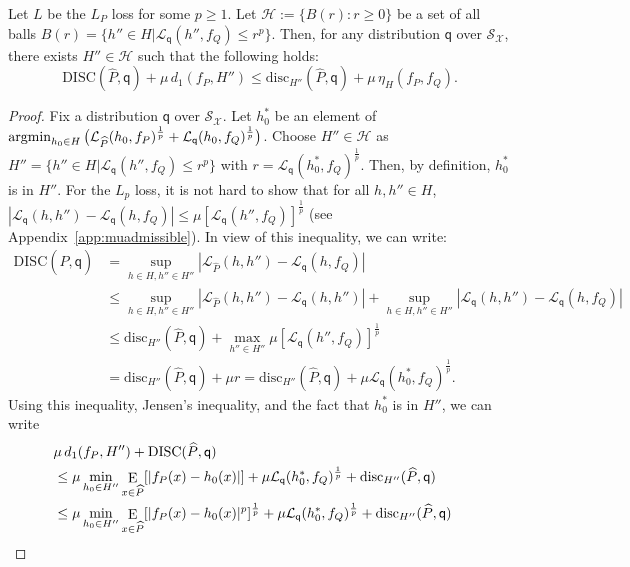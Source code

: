 \documentclass[twoside,11pt]{article}
\DeclareMathOperator*{\E}{\rm E}
\DeclareMathOperator*{\argmin}{\rm argmin}
\newcommand{\h}{\widehat}
\newcommand{\cL}{{\mathcal L}}
\newcommand{\cS}{{\mathcal S}}
\newcommand{\cX}{{\mathcal X}}
\newcommand{\1}{\mat{1}}
\newcommand{\qq}{{\mathsf q}}
\newcommand{\dis}{\mathrm{disc}}
\newcommand{\DIS}{\mathrm{DISC}}
\newcommand{\done}{d_1}
\begin{document}
\begin{theorem}
\label{th:betterbound}
Let $L$ be the $L_P$ loss for some $p \geq 1$.  Let
$\mathscr{H} := \{B(r)\colon r \geq 0\}$ be a set of all balls
$B(r) = \{ h'' \in H |\cL_{\qq}(h'', f_Q)\leq r^p \}$. Then, for any
distribution $\qq$ over $\cS_\cX$, there exists $H'' \in {\mathscr H}$
such that the following holds:
\begin{equation*}
  \DIS(\h P, \qq)  + \mu \, \done(f_P, H'')
\leq \dis_{H''}(\h P, \qq) + \mu \, \eta_H(f_P, f_Q) .
\end{equation*}
\end{theorem}

\begin{proof}
  Fix a distribution $\qq$ over $\cS_\cX$.  Let $h_0^*$ be an element of
$\argmin_{h_0 \in H} \big(\cL_{\h P}(h_0, f_P)^{\frac{1}{p}} +
\cL_{\qq}(h_0, f_Q)^{\frac{1}{p}} \big)$.
Choose $H'' \in {\mathscr H}$ as
$H'' = \{h'' \in H | \cL_{\qq}(h'', f_Q) \leq r^p\}$ with
$r = \cL_{\qq}(h^*_0, f_Q)^{\frac{1}{p}}$. Then,
by definition, $h_0^*$ is in $H''$.  For the $L_p$ loss, it is not
hard to show that for all $h, h'' \in H$,
$| \cL_{\qq}(h, h'') - \cL_{\qq}(h, f_Q)|
\leq \mu [\cL_{\qq}(h'',f_Q)]^{\frac{1}{p}}$
(see Appendix~\ref{app:muadmissible}). In view of this inequality, we
can write:
\begin{align*}
\DIS(\h P, \qq) & = \sup_{h \in H, h'' \in H''} |\cL_{\h P}(h, h'') -
  \cL_{\qq}(h,  f_Q) | \\
 & \leq  \sup_{h \in H, h'' \in H''} |\cL_{\h P}(h, h'')
 - \cL_{\qq}(h,  h'') | + \sup_{h \in H, h'' \in H''} | \cL_{\qq}(h, h'') -
  \cL_{\qq}(h, f_Q)|   \\
& \leq \dis_{H''}(\h P, \qq) + \max_{h'' \in H''}\mu [\cL_{\qq}(h'',
f_Q)]^{\frac{1}{p}}  \\
& =  \dis_{H''}(\h P, \qq) + \mu r
=  \dis_{H''}(\h P, \qq) + \mu \cL_{\qq}(h^*_0, f_Q)^{\frac{1}{p}} .
\end{align*}
Using this inequality, Jensen's inequality, and the fact that $h_0^*$
is in $H''$, we can write
\begin{align*}
\lefteqn{ \mu \, \done(f_P, H'') + \DIS(\h P , \qq)} \\
& \leq  \mu \min_{h_0 \in H''} \E_{x \in \h P}
  [|f_P(x) - h_0(x)|] + \mu \cL_{\qq}(h^*_0, f_Q)^{\frac{1}{p}} + \dis_{H''}(\h P, \qq)  \\
& \leq  \mu \min_{h_0 \in H''} \E_{x \in \h P}
  [|f_P(x) - h_0(x)|^p]^{\frac{1}{p}} + \mu \cL_{\qq}(h^*_0, f_Q)^{\frac{1}{p}} + \dis_{H''}(\h P, \qq)  \\

\end{align*}
\end{proof}
\end{document}
